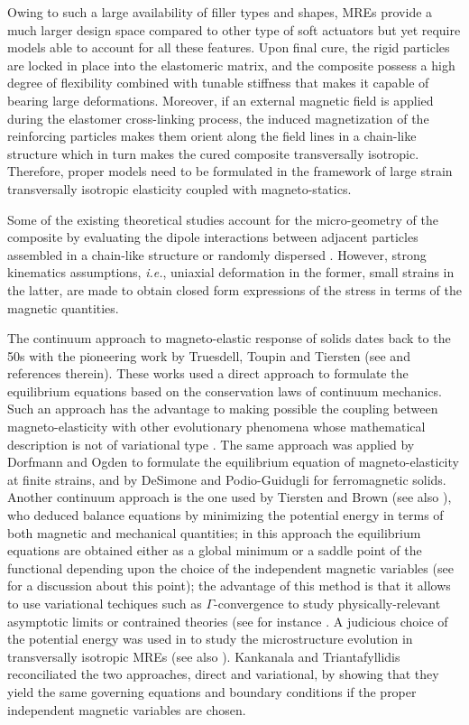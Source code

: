 \documentclass[oneside]{article}
\begin{document}
Owing to such a large availability of filler types and shapes, MREs provide a much larger design space compared to other type of soft actuators but yet require models able to account for all these features. Upon final cure, the rigid particles are locked in place into the elastomeric matrix, and the composite possess a high degree of flexibility combined with tunable stiffness that makes it capable of bearing large deformations. Moreover, if an external magnetic field is applied during the elastomer cross-linking process, the induced magnetization of the reinforcing particles makes them orient along the field lines in a chain-like structure which in turn makes the cured composite transversally isotropic. Therefore, proper models need to be formulated in the framework of large strain transversally isotropic elasticity coupled with magneto-statics.

Some of the existing theoretical studies account for the micro-geometry of the composite by evaluating the dipole interactions between adjacent particles assembled in a chain-like structure \cite{Jolly1996} or randomly dispersed \cite{Borcea2001}. However, strong kinematics assumptions, \textit{i.e.}, uniaxial deformation in the former, small strains in the latter, are made to obtain closed form expressions of the stress in terms of the magnetic quantities. 

The continuum approach to magneto-elastic response of solids dates back to the 50s with the pioneering work by Truesdell, Toupin and Tiersten (see \cite{Dorfmann2014} and references therein). These works used a direct approach to formulate the equilibrium equations based on the conservation laws of continuum mechanics. Such an approach has the advantage to making possible the coupling between magneto-elasticity with other evolutionary phenomena whose mathematical description is not of variational type \cite{RT2013,RT2017}. The same approach was applied by Dorfmann and Ogden \cite{Dorfmann2004} to formulate the equilibrium equation of magneto-elasticity at finite strains, and by DeSimone and Podio-Guidugli \cite{DeSimone1996} for ferromagnetic solids. Another continuum approach is the one used by Tiersten and Brown \cite{Brown1965} (see also \cite{Kovetz2008}), who deduced balance equations by minimizing the potential energy in terms of both magnetic and mechanical quantities; in this approach the equilibrium equations are obtained either as a global minimum or a saddle point of the functional depending upon the choice of the independent magnetic variables (see \cite{Ericksen2005} for a discussion about this point); the advantage of this method is that it allows to use variational techiques such as $\Gamma$-convergence to study physically-relevant asymptotic limits or contrained theories (see for instance \cite{desimone2}. A judicious choice of the potential energy was used in \cite{Rudykh2013,Goshkoderia2017} to study the microstructure evolution in transversally isotropic MREs (see also \cite{Galipeau2014}). Kankanala and Triantafyllidis \cite{Kankanala2004} reconciliated the two approaches, direct and variational, by showing that they yield the same governing equations and boundary conditions if the proper independent magnetic variables are chosen.
\end{document}
